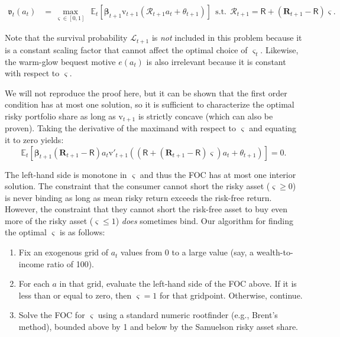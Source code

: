 \documentclass[12pt,letterpaper, fleqn]{article}
\newcommand{\Rport}{\mathcal{R}}
\newcommand{\vFunc}{\mathrm{v}}
\newcommand{\Alive}{\mathcal{L}}
\newcommand{\Ex}{\mathbb{E}}
\newcommand{\aNrm}{a}
\newcommand{\Rfree}{\mathsf{R}}
\newcommand{\Risky}{\mathbf{R}}
\begin{document}
\begin{align}
\mathfrak{v}_{t}(\aNrm_t) & = \max_{\varsigma \in [0,1]}~~ \Ex_{t}\left[ \pmb{\beta}_{t+1} \vFunc_{t+1}(\Rport_{t+1} \aNrm_t + \theta_{t+1}) \right] ~~ \text{s.t.} ~~ \Rport_{t+1} = \Rfree + (\Risky_{t+1 }-\Rfree)\varsigma.
\end{align}

Note that the survival probability $\Alive_{t+1}$ is \textit{not} included in this problem because it is a constant scaling factor that cannot affect the optimal choice of $\varsigma_t$. Likewise, the warm-glow bequest motive $e(\aNrm_t)$ is also irrelevant because it is constant with respect to $\varsigma$.

We will not reproduce the proof here, but it can be shown that the first order condition has at most one solution, so it is sufficient to characterize the optimal risky portfolio share as long as $\vFunc_{t+1}$ is strictly concave (which can also be proven). Taking the derivative of the maximand with respect to $\varsigma$ and equating it to zero yields:
\begin{equation}
\label{eq:foc-share}
\Ex_{t}\left[ \pmb{\beta}_{t+1} (\Risky_{t+1}-\Rfree) \aNrm_t \vFunc'_{t+1}((\Rfree + (\Risky_{t+1}-\Rfree)\varsigma) \aNrm_t + \theta_{t+1}) \right] = 0.
\end{equation}

The left-hand side is monotone in $\varsigma$ and thus the FOC has at most one interior solution. The constraint that the consumer cannot short the risky asset ($\varsigma \geq 0$) is never binding as long as mean risky return exceeds the risk-free return. However, the constraint that they cannot short the risk-free asset to buy even more of the risky asset ($\varsigma \leq 1$) \textit{does} sometimes bind. Our algorithm for finding the optimal $\varsigma$ is as follows:

\begin{enumerate}
\item Fix an exogenous grid of $\aNrm_t$ values from 0 to a large value (say, a wealth-to-income ratio of 100).


\item For each $\aNrm$ in that grid, evaluate the left-hand side of the FOC above. If it is less than or equal to zero, then $\varsigma = 1$ for that gridpoint. Otherwise, continue.


\item Solve the FOC for $\varsigma$ using a standard numeric rootfinder (e.g., Brent's method), bounded above by 1 and below by the Samuelson risky asset share.
\end{enumerate}
\end{document}

